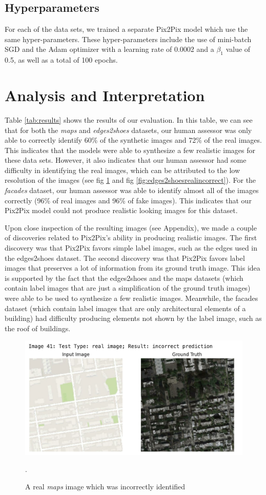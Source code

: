 \documentclass[peerreview]{IEEEtran}
\begin{document}
\subsection{Hyperparameters}
For each of the data sets, we trained a separate Pix2Pix model which use the same hyper-parameters. These hyper-parameters include the use of mini-batch SGD and the Adam optimizer with a learning rate of 0.0002 and a $\beta_1$ value of 0.5, as well  as a total of 100 epochs.

\section{Analysis and Interpretation}
Table \ref{tab:results} shows the results of our evaluation. In this table, we can see that for both the \textit{maps} and \textit{edges2shoes} datasets, our human assessor was only able to correctly identify 60\% of the synthetic images and 72\% of the real images. This indicates that the models were able to synthesize a few realistic images for these data sets. However, it also indicates that our human assessor had some difficulty in identifying the real images, which can be attributed to the low resolution of the images (see fig \ref{fig:mapsrealincorrect} and fig \ref{fig:edges2shoesrealincorrect}). For the \textit{facades} dataset, our human assessor was able to identify almost all of the images correctly (96\% of real images and 96\% of fake images). This indicates that our Pix2Pix model could not produce realistic looking images for this dataset. 

Upon close inspection of the resulting images (see Appendix), we made a couple of discoveries related to Pix2Pix's ability in producing realistic images. The first discovery was that Pix2Pix favors simple label images, such as the edges used in the edges2shoes dataset. The second discovery was that Pix2Pix favors label images that preserves a lot of information from its ground truth image. This idea is supported by the fact that the edges2shoes and the maps datasets (which contain label images that are just a simplification of the ground truth images) were able to be used to synthesize a few realistic images. Meanwhile, the facades dataset (which contain label images that are only architectural elements of a building) had difficulty producing elements not shown by the label image, such as the roof of buildings.

\begin{figure}[t]
\centering
\includegraphics[width=0.8\columnwidth]{Maps real incorrect.png} 
\caption{A real \textit{maps} image which was incorrectly identified}.
\label{fig:mapsrealincorrect}
\end{figure}
\end{document}
